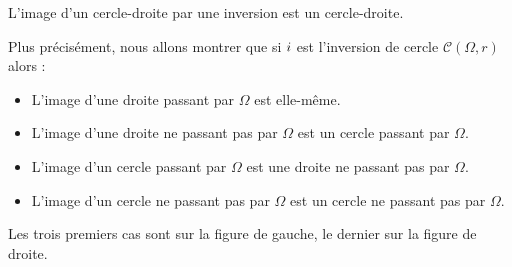 \documentclass[11pt,class=report,crop=false]{standalone}
\begin{document}
\begin{theoreme}
L'image d'un cercle-droite par une inversion est un cercle-droite. 
\end{theoreme}


Plus précisément, nous allons montrer que si $i$ est l'inversion
de cercle $\mathcal{C}(\Omega,r)$ alors :
\begin{itemize}
  \item L'image d'une droite passant par $\Omega$ est elle-même.
  
  \item L'image d'une droite ne passant pas par $\Omega$ est un cercle passant par $\Omega$.
  
  \item L'image d'un cercle passant par $\Omega$ est une droite ne passant pas par $\Omega$.
  
  \item L'image d'un cercle ne passant pas par $\Omega$ est un cercle ne passant pas par $\Omega$.
\end{itemize}

Les trois premiers cas sont sur la figure de gauche, le dernier sur la figure de droite. 
\end{document}

